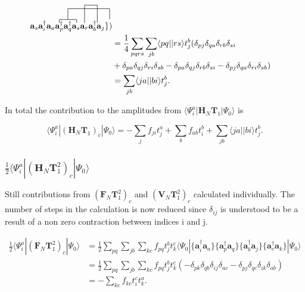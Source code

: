 \documentclass[a4paper,norsk,11pt,twoside]{report}
\begin{document}
\begin{align}
{\textbf{a}_s}
\contraction
{\textbf{a}^{\dag}_i}
{\textbf{a}_a}
{\textbf{a}^{\dag}_p}
{\textbf{a}^{\dag}_q}
\contraction[3ex]
{\textbf{a}^{\dag}_i \textbf{a}_a}
{\textbf{a}^{\dag}_p}
{\textbf{a}^{\dag}_q \textbf{a}_s \textbf{a}_r \textbf{a}^{\dag}_b}{\textbf{a}_j}
\contraction[5ex]{\textbf{a}^{\dag}_i \textbf{a}_a 
\textbf{a}^{\dag}_p \textbf{a}^{\dag}_q
}{\textbf{a}_s}{}{\textbf{a}_r \textbf{a}^{\dag}_b}
\textbf{a}^{\dag}_i \textbf{a}_a 
\textbf{a}^{\dag}_p \textbf{a}^{\dag}_q
\textbf{a}_s \textbf{a}_r
\textbf{a}^{\dag}_b \textbf{a}_j
\} ) \nonumber \\ &
=  \frac{1}{4} \sum_{pqrs} \sum_{jb} \langle pq||rs \rangle t_j^b (
\delta_{pj} \delta_{qa} \delta_{rb} \delta_{si} \nonumber \\ &
+ \delta_{pa} \delta_{qj} \delta_{ri} \delta_{sb}
- \delta_{pa} \delta_{qj} \delta_{rb} \delta_{si}
- \delta_{pj} \delta_{qa} \delta_{ri} \delta_{sb} ) \nonumber \\ &
= \sum_{jb} \langle ja||bi \rangle t_j^b .
\end{align}

In total the contribution to the amplitudes from $\langle \Psi_i^a | \textbf{H}_N \textbf{T}_1 | \Psi_0 \rangle$ is

\begin{equation}
\langle \Psi_i^a | (\textbf{H}_N \textbf{T}_1)_c | \Psi_0 \rangle = - \sum_j f_{ji} t_j^a + \sum_b f_{ab} t_i^b
\nonumber +  \sum_{jb} \langle ja||bi \rangle t_j^b . \label{t1amp_2}
\end{equation}

\subsubsection{$\frac{1}{2} \langle \Psi_i^a | (\textbf{H}_N \textbf{T}_1^2)_c | \Psi_0 \rangle$}
Still contributions from $(\textbf{F}_N \textbf{T}_1^2)_c$ and $(\textbf{V}_N \textbf{T}_1^2)_c$ calculated individually. The number of steps in the calculation is now reduced since $\delta_{ij}$ is understood to be a result of a non zero contraction between indices i and j.

\begin{align}
\frac{1}{2} \langle \Psi_i^a | (\textbf{F}_N \textbf{T}_1^2)_c | \Psi_0 \rangle & = 
\frac{1}{2} \sum_{pq} \sum_{jb} \sum_{kc} f_{pq} t_j^b t_k^c \langle \Psi_0 | \{\textbf{a}_i^{\dag} \textbf{a}_a \} \{\textbf{a}_p^{\dag} \textbf{a}_q \} \{\textbf{a}_b^{\dag} \textbf{a}_j \} \{\textbf{a}_c^{\dag} \textbf{a}_k \} | \Psi_0 \rangle \nonumber \\ &
= \frac{1}{2} \sum_{pq} \sum_{jb} \sum_{kc} f_{pq} t_j^b t_k^c
\left( -\delta_{pk} \delta_{qb} \delta_{ij} \delta_{ac}
- \delta_{pj} \delta_{qc} \delta_{ik} \delta_{ab} \right) \nonumber \\ &
= - \sum_{kc} f_{kc} t_i^c t_k^a .
\end{align}
\end{document}
